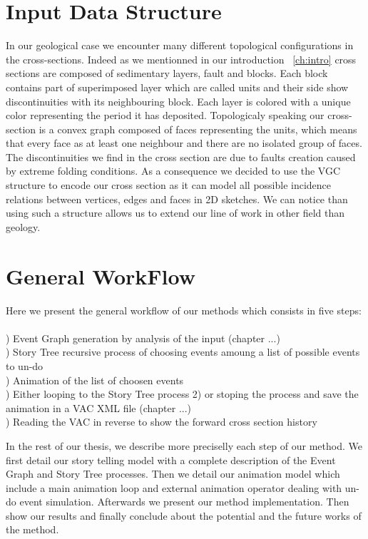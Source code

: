 \documentclass[12pt, a4paper]{report} %
\begin{document}
\section{Input Data Structure}
In our geological case we encounter many different topological configurations in the cross-sections. Indeed as we mentionned in our introduction ~\ref{ch:intro} cross sections are composed of sedimentary layers, fault and blocks. Each block contains part of superimposed layer which are called units and their side show discontinuities with its neighbouring block. Each layer is colored with a unique color representing the period it has deposited. Topologicaly speaking our cross-section is a convex graph composed of faces representing the units, which means that every face as at least one neighbour and there are no isolated group of faces. The discontinuities we find in the cross section are due to faults creation caused by extreme folding conditions. As a consequence we decided to use the VGC \cite{vgc} structure to encode our cross section as it can model all possible incidence relations between vertices, edges and faces in 2D sketches. We can notice than using such a structure allows us to extend our line of work in other field than geology.

\section{General WorkFlow}

Here we present the general workflow  of our methods which consists in five steps:\\\\

) Event Graph generation by analysis of the input (chapter ...)\\
) Story Tree recursive process of choosing events amoung a list of possible events to un-do\\
) Animation of the list of choosen events \\
) Either looping to the Story Tree process 2) or stoping the process and save the animation in a VAC XML file\cite{vac} (chapter ...)\\
) Reading the VAC in reverse to show the forward cross section history

In the rest of our thesis, we describe more preciselly each step of our method. We first detail our story telling model with a complete description of the Event Graph and Story Tree processes. Then we detail our animation model  which include a main animation loop and external animation operator dealing with un-do event simulation. Afterwards we present our method implementation. Then show our results and finally conclude about the potential and the future works of the method. 
 
\end{document}
